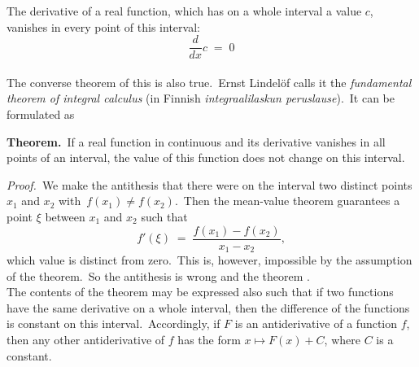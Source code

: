 \documentclass[12pt]{article}
\theoremstyle{definition}
\begin{document}
The derivative of a real function, which has on a whole interval a  value $c$, vanishes in every point of this interval:
$$\frac{d}{dx}c \;=\; 0$$\\

The converse theorem of this is also true.\, Ernst Lindel\"of calls it the \emph{fundamental theorem of integral calculus} (in Finnish \emph{integraalilaskun peruslause}).\, It can be formulated as

\textbf{Theorem.}\, If a real function in continuous and its derivative vanishes in all points of an interval, the value of this function does not change on this interval.

\emph{Proof.}\, We make the antithesis that there were on the interval two distinct points $x_1$ and $x_2$ with\, $f(x_1) \neq f(x_2)$.\, Then the mean-value theorem guarantees a point $\xi$ between $x_1$ and $x_2$ such that
$$f'(\xi) \;=\; \frac{f(x_1)\!-\!f(x_2)}{x_1\!-\!x_2},$$
which value is distinct from zero.\, This is, however, impossible by the assumption of the theorem.\, So the antithesis is wrong and the theorem .\\

The contents of the theorem may be expressed also such that if two functions have the same derivative on a whole interval, then the difference of the functions is constant on this interval.\, Accordingly, if $F$ is an antiderivative of a function $f$, then any other antiderivative of $f$ has the form $x \mapsto F(x)\!+\!C$, where $C$ is a constant.






\end{document}
